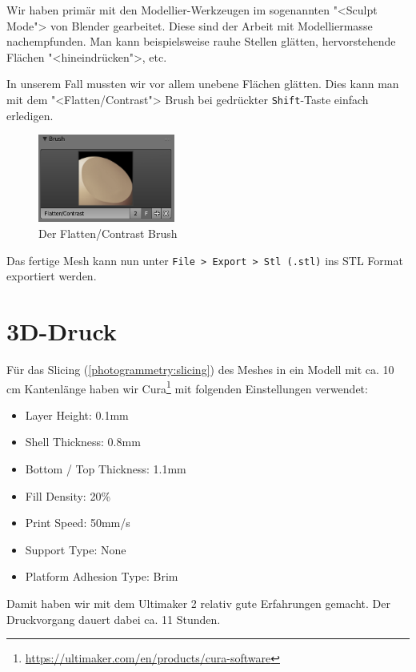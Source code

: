 Wir haben primär mit den Modellier-Werkzeugen im sogenannten "<Sculpt Mode"> von
Blender gearbeitet. Diese sind der Arbeit mit Modelliermasse nachempfunden. Man
kann beispielsweise rauhe Stellen glätten, hervorstehende Flächen
"<hineindrücken">, etc. 

In unserem Fall mussten wir vor allem unebene Flächen glätten. Dies kann man mit
dem "<Flatten/Contrast"> Brush bei gedrückter \texttt{Shift}-Taste einfach
erledigen.

\begin{figure}[H]
	\centering
	\includegraphics[width=0.4\textwidth]{images/blender_flatten_brush.png}
	\caption{Der Flatten/Contrast Brush}
	\label{img:blender_brush}
\end{figure}

Das fertige Mesh kann nun unter \texttt{File > Export > Stl (.stl)} ins STL
Format exportiert werden.


\section{3D-Druck}

Für das Slicing (\autoref{photogrammetry:slicing}) des Meshes in ein Modell mit
ca. 10 cm Kantenlänge haben wir
Cura\footnote{\url{https://ultimaker.com/en/products/cura-software}} mit
folgenden Einstellungen verwendet:

\begin{itemize}
	\setlength\itemsep{0.3em}
	\item Layer Height: 0.1mm
	\item Shell Thickness: 0.8mm
	\item Bottom / Top Thickness: 1.1mm
	\item Fill Density: 20\%
	\item Print Speed: 50mm/s
	\item Support Type: None
	\item Platform Adhesion Type: Brim
\end{itemize}

\noindent Damit haben wir mit dem Ultimaker 2 relativ gute Erfahrungen gemacht.
Der Druckvorgang dauert dabei ca. 11 Stunden.

